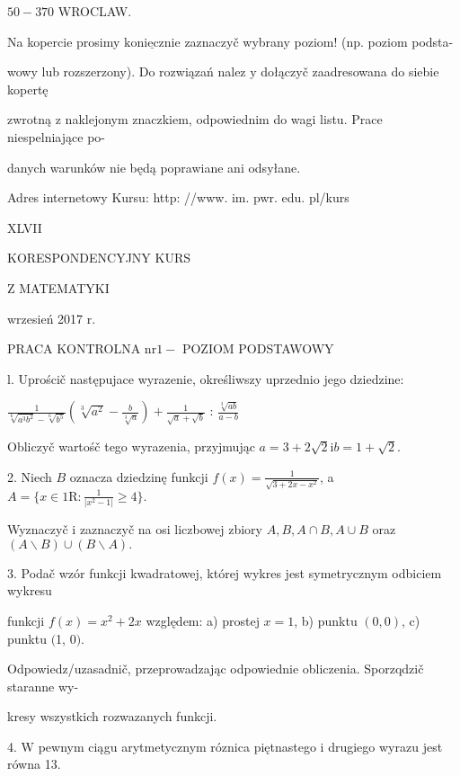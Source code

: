 \documentclass[a4paper,12pt]{article}
\begin{document}
$50-370$ WROCLAW.

Na kopercie prosimy $\underline{\mathrm{k}\mathrm{o}\mathrm{n}\mathrm{i}\mathrm{e}\mathrm{c}\mathrm{z}\mathrm{n}\mathrm{i}\mathrm{e}}$ zaznaczyč wybrany poziom! (np. poziom podsta-

wowy lub rozszerzony). Do rozwiązań nalez $\mathrm{y}$ dołączyč zaadresowana do siebie kopertę

zwrotną $\mathrm{z}$ naklejonym znaczkiem, odpowiednim do wagi listu. Prace niespelniające po-

danych warunków nie będą poprawiane ani odsyłane.

Adres internetowy Kursu: http: //www. im. pwr. edu. pl/kurs







XLVII

KORESPONDENCYJNY KURS

Z MATEMATYKI

wrzesień 2017 r.

PRACA KONTROLNA $\mathrm{n}\mathrm{r} 1 -$ POZIOM PODSTAWOWY

l. Uprościč następujace wyrazenie, określiwszy uprzednio jego dziedzine:

$\displaystyle \frac{1}{\sqrt[6]{a^{3}b^{2}}-\sqrt[6]{b^{5}}}(\sqrt[3]{a^{2}}-\frac{b}{\sqrt[3]{a}})+\frac{1}{\sqrt{a}+\sqrt{b}}$ : $\displaystyle \frac{\sqrt[3]{ab}}{a-b}$

Obliczyč wartośč tego wyrazenia, przyjmując $a=3+2\sqrt{2} \mathrm{i} b=1+\sqrt{2}.$

2. Niech $B$ oznacza dziedzinę funkcji $f(x)=\displaystyle \frac{1}{\sqrt{3+2x-x^{2}}}$, a $A=\displaystyle \{x\in 1\mathrm{R}:\frac{1}{|x^{2}-1|}\geq 4\}.$

Wyznaczyč $\mathrm{i}$ zaznaczyč na osi liczbowej zbiory $A, B, A\cap B, A\cup B$ oraz $(A\backslash B)\cup(B\backslash A).$

3. Podač wzór funkcji kwadratowej, której wykres jest symetrycznym odbiciem wykresu

funkcji $f(x)=x^{2}+2x$ względem: a) prostej $x=1$, b) punktu $(0,0)$, c) punktu $($1, $0).$

Odpowiedz/uzasadnič, przeprowadzając odpowiednie obliczenia. Sporzqdzič staranne wy-

kresy wszystkich rozwazanych funkcji.

4. $\mathrm{W}$ pewnym ciągu arytmetycznym róznica piętnastego $\mathrm{i}$ drugiego wyrazu jest równa 13.
\end{document}

